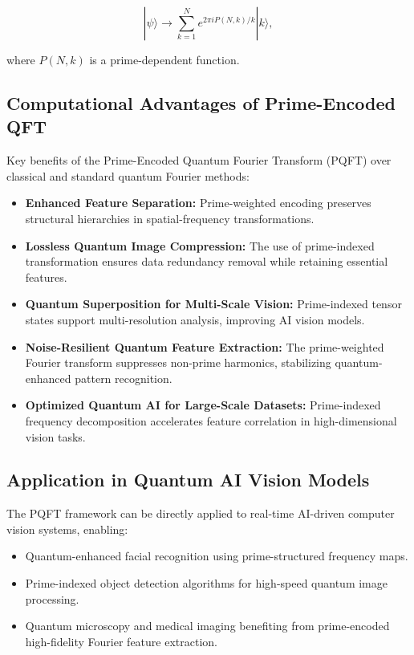 \documentclass{article}
\theoremstyle{plain}
\begin{document}
\begin{equation}
|\psi\rangle \to \sum_{k=1}^{N} e^{2\pi i P(N,k) / k} |k\rangle,
\end{equation}

where \( P(N,k) \) is a prime-dependent function.

\subsection{Computational Advantages of Prime-Encoded QFT}

Key benefits of the Prime-Encoded Quantum Fourier Transform (PQFT) over classical and standard quantum Fourier methods:

\begin{itemize}
    \item \textbf{Enhanced Feature Separation:} Prime-weighted encoding preserves structural hierarchies in spatial-frequency transformations.
    \item \textbf{Lossless Quantum Image Compression:} The use of prime-indexed transformation ensures data redundancy removal while retaining essential features.
    \item \textbf{Quantum Superposition for Multi-Scale Vision:} Prime-indexed tensor states support multi-resolution analysis, improving AI vision models.
    \item \textbf{Noise-Resilient Quantum Feature Extraction:} The prime-weighted Fourier transform suppresses non-prime harmonics, stabilizing quantum-enhanced pattern recognition.
    \item \textbf{Optimized Quantum AI for Large-Scale Datasets:} Prime-indexed frequency decomposition accelerates feature correlation in high-dimensional vision tasks.
\end{itemize}

\subsection{Application in Quantum AI Vision Models}
The PQFT framework can be directly applied to real-time AI-driven computer vision systems, enabling:
\begin{itemize}
    \item Quantum-enhanced facial recognition using prime-structured frequency maps.
    \item Prime-indexed object detection algorithms for high-speed quantum image processing.
    \item Quantum microscopy and medical imaging benefiting from prime-encoded high-fidelity Fourier feature extraction.
\end{itemize}
\end{document}
